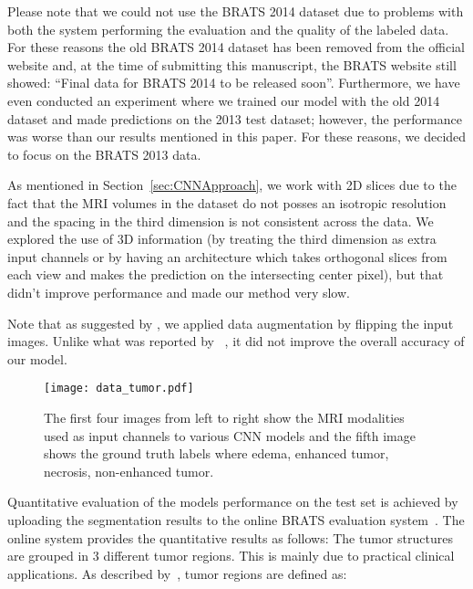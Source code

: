 \documentclass[final,5p,times,twocolumn]{elsarticle}
\begin{document}
Please note that we could not use the BRATS 2014 dataset due to problems with both the system performing the evaluation and the quality of the labeled data. For these reasons the old BRATS 2014 dataset has been removed from the official website and, at the time of submitting this manuscript, the BRATS website still showed: ``Final data for BRATS 2014 to be released soon''. Furthermore, we have even conducted an experiment where we trained our model with the old 2014 dataset and made predictions on the 2013 test dataset; however, the performance was worse than our results mentioned in this paper. For these reasons, we decided to focus on the BRATS 2013 data.

As mentioned in Section~\ref{sec:CNNApproach}, we work with 2D slices due to the fact that the MRI volumes in the dataset do not posses an isotropic resolution and the spacing in the third dimension is not consistent across the data. We explored the use of 3D information (by treating the third dimension as extra input channels or by having an architecture which takes orthogonal slices from each view and makes the prediction on the intersecting center pixel), but that didn't improve performance and made our method very slow.

Note that as suggested by \citet{Krizhevsky-2012-small}, we applied data augmentation by flipping the input images.  Unlike what was reported by ~\citet{zeiler2014},  it did not improve the overall accuracy of our model. 





\begin{figure}
\centering
\texttt{[image: data\_tumor.pdf]}
\caption{The first four images from left to right show the MRI modalities used as input channels to various CNN models and the fifth image shows the ground truth labels where \textcolor[RGB]{135,213,120}{} edema, \textcolor[RGB]{225,225,95}{} enhanced tumor,
\textcolor[RGB]{246,145,139}{} necrosis,
\textcolor[RGB]{124,167,208}{} non-enhanced tumor.}
\label{fig:data}
\end{figure} 

 Quantitative evaluation of the models performance on the test set is achieved by uploading the segmentation results to the online BRATS evaluation system~\citep{BRATSURL}. The online system provides the quantitative results as follows: 
The tumor structures are grouped in 3 different tumor regions. This is mainly due to practical clinical applications. 
As described by~\citet{Menze2014}, tumor regions are defined as:
\end{document}
